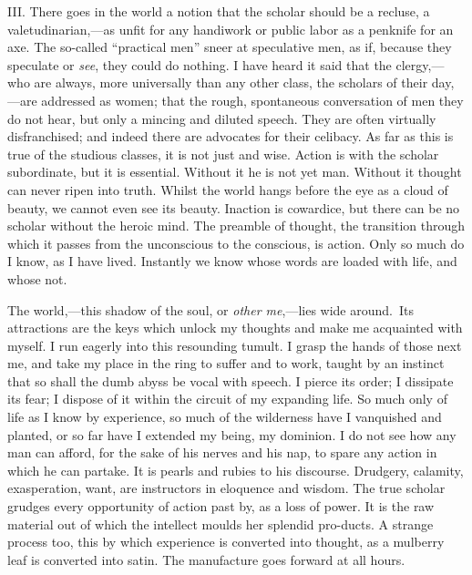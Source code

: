 III. There goes in the world a notion that the scholar should be a
recluse, a val\-e\-tu\-di\-nar\-i\-an,---as unfit for any handiwork or
public labor as a penknife for an axe. The so-called ``practical men''
sneer at speculative men, as if, because they speculate or
\textit{see}, they could do nothing. I have heard it said that the
cler\-gy,---who are always, more universally than any other class, the
scholars of their day,---are addressed as women; that the rough,
spontaneous conversation of men they do not hear, but only a mincing
and diluted speech. They are often virtually disfranchised; and indeed
there are advocates for their celibacy. As far as this is true of the
studious classes, it is not just and wise. Action is with the
scholar subordinate, but it is essential. Without it he is not yet
man. Without it thought can never ripen into truth. Whilst the world
hangs before the eye as a cloud of beauty, we cannot even see its
beauty. Inaction is cowardice, but there can be no scholar without the
heroic mind. The preamble of thought, the transition  through
which it passes from the unconscious to the conscious, is action. Only
so much do I know, as I have lived. Instantly we know whose words
are loaded with life, and whose not.

The world,---this shadow of the soul, or \textit{other me},---lies
wide around. Its attractions are the keys which unlock my thoughts and
make me acquainted with myself. I run eagerly into this resounding
tumult. I grasp the hands of those next me, and take my place in the
ring to suffer and to work, taught by an instinct that so shall the
dumb abyss be vocal with speech. I pierce its order; I dissipate its
fear; I dispose of it within the circuit of my expanding life. So much
only of life as I know by experience, so much of the wilderness have I
vanquished and planted, or so far have I extended my being, my
dominion. I do not see how any man can afford, for the sake of his
nerves and his nap, to spare any action in which he can partake. It is
pearls and rubies to his discourse. Drudgery, calamity, exasperation,
want, are instructors in eloquence and wisdom. The true scholar
grudges every opportunity of action past by, as a loss of power. It is
the raw material out of which the intellect moulds her splendid
pro-ducts. A strange process too, this by which experience is
converted into thought, as a mulberry leaf is converted into satin.
The manufacture goes forward at all hours.

